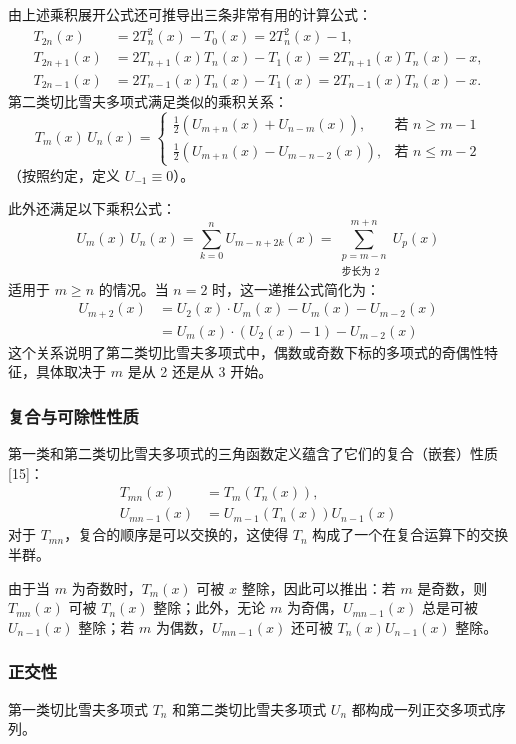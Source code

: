 由上述乘积展开公式还可推导出三条非常有用的计算公式：
$$
\begin{aligned}
T_{2n}(x) &= 2T_n^2(x) - T_0(x) = 2T_n^2(x) - 1, \\
T_{2n+1}(x) &= 2T_{n+1}(x) T_n(x) - T_1(x) = 2T_{n+1}(x) T_n(x) - x, \\
T_{2n-1}(x) &= 2T_{n-1}(x) T_n(x) - T_1(x) = 2T_{n-1}(x) T_n(x) - x.
\end{aligned}~
$$
第二类切比雪夫多项式满足类似的乘积关系：
$$
T_m(x)\, U_n(x) =
\begin{cases}
\frac{1}{2} \left( U_{m+n}(x) + U_{n - m}(x) \right), & \text{若 } n \geq m - 1 \\
\frac{1}{2} \left( U_{m+n}(x) - U_{m - n - 2}(x) \right), & \text{若 } n \leq m - 2
\end{cases}~
$$
（按照约定，定义 $U_{-1} \equiv 0$）。

此外还满足以下乘积公式：
$$
U_m(x)\, U_n(x) = \sum_{k = 0}^{n} U_{m - n + 2k}(x) = \sum_{\substack{p = m - n \\ \text{步长为 2}}}^{m + n} U_p(x)~
$$
适用于 $m \geq n$ 的情况。当 $n = 2$ 时，这一递推公式简化为：
$$
\begin{aligned}
U_{m+2}(x)
&= U_2(x) \cdot U_m(x) - U_m(x) - U_{m-2}(x) \\
&= U_m(x) \cdot \left( U_2(x) - 1 \right) - U_{m-2}(x)
\end{aligned}~
$$
这个关系说明了第二类切比雪夫多项式中，偶数或奇数下标的多项式的奇偶性特征，具体取决于 $m$ 是从 2 还是从 3 开始。
\subsubsection{复合与可除性性质}
第一类和第二类切比雪夫多项式的三角函数定义蕴含了它们的复合（嵌套）性质[15]：
$$
\begin{aligned}
T_{mn}(x) &= T_m(T_n(x)), \\
U_{mn - 1}(x) &= U_{m - 1}(T_n(x))U_{n - 1}(x)
\end{aligned}~
$$
对于 $T_{mn}$，复合的顺序是可以交换的，这使得 $T_n$ 构成了一个在复合运算下的交换半群。

由于当 $m$ 为奇数时，$T_m(x)$ 可被 $x$ 整除，因此可以推出：若 $m$ 是奇数，则 $T_{mn}(x)$ 可被 $T_n(x)$ 整除；此外，无论 $m$ 为奇偶，$U_{mn - 1}(x)$ 总是可被 $U_{n - 1}(x)$ 整除；若 $m$ 为偶数，$U_{mn - 1}(x)$ 还可被 $T_n(x) U_{n - 1}(x)$ 整除。
\subsubsection{正交性}
第一类切比雪夫多项式 $T_n$ 和第二类切比雪夫多项式 $U_n$ 都构成一列正交多项式序列。

